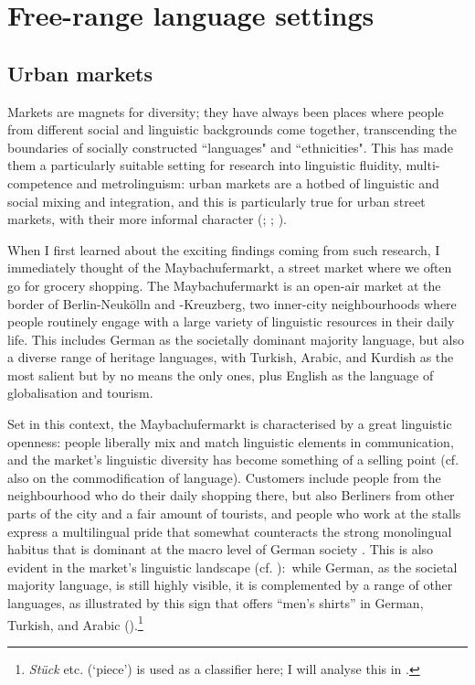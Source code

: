 \section{Free-range language settings}
\label{bkm:Ref82075181}\hypertarget{Toc125444652}{}
\subsection{Urban markets}
\hypertarget{Toc125444653}{}
Markets are magnets for diversity; they have always been places where people from different social and linguistic backgrounds come together, transcending the boundaries of socially constructed “languages" and “ethnicities". This has made them a particularly suitable setting for research into linguistic fluidity, multi-competence and metrolinguism: urban markets are a hotbed of linguistic and social mixing and integration, and this is particularly true for urban street markets, with their more informal character (\citealt{HiebertEtal2015}; \citealt{PennycookOtsuji2015,PennycookOtsuji2019}; \citealt{Adami2018}).

When I first learned about the exciting findings coming from such research, I immediately thought of the Maybachufermarkt, a street market where we often go for grocery shopping. The Maybachufermarkt is an open-air market at the border of Berlin-Neukölln and -Kreuzberg, two inner-city neighbourhoods where people routinely engage with a large variety of linguistic resources in their daily life. This includes German as the societally dominant majority language, but also a diverse range of heritage languages, with Turkish, Arabic, and Kurdish as the most salient but by no means the only ones, plus English as the language of globalisation and tourism.

Set in this context, the Maybachufermarkt is characterised by a great linguistic openness: people liberally mix and match linguistic elements in communication, and the market’s linguistic diversity has become something of a selling point (cf. also \citealt{Heller2010} on the commodification of language). Customers include people from the neighbourhood who do their daily shopping there, but also Berliners from other parts of the city and a fair amount of tourists, and people who work at the stalls express a multilingual pride that somewhat counteracts the strong monolingual habitus that is dominant at the macro level of German society \citep{Wiese2020_contact}. This is also evident in the market’s linguistic landscape (cf. \cite{DumanÇakır2023}):\ while German, as the societal majority language, is still highly visible, it is complemented by a range of other languages, as illustrated by this sign that offers “men’s shirts” in German, Turkish, and Arabic ().\footnote{\textit{Stück} etc. (`piece') is used as a classifier here; I will analyse this in .}

